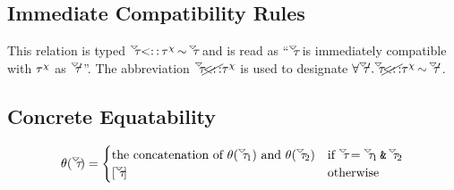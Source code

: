 \documentclass{article}
\begin{document}
\subsection*{Immediate Compatibility Rules}

{\footnotesize This relation is typed $\tauDownOpen \immCompat \tauChi \icSeparator \tauDownOpen$ and is read as ``$\tauDownOpen$ is immediately compatible with $\tauChi$ as $\tauDownOpen'$''.  The abbreviation $\tauDownOpen \cancel{\immCompat} \tauChi$ is used to designate $\forall \tauDownOpen' . \tauDownOpen \cancel{\immCompat} \tauChi \icSeparator \tauDownOpen'$.}

\begin{mathpar}
    
    
    
    
    
    
\end{mathpar}

\subsection*{Concrete Equatability}

$$
\flatten{\tauDownOpen} =
    \begin{cases}
        \textrm{the concatenation of }\flatten{\tauDownOpen_1}\textrm{ and }\flatten{\tauDownOpen_2} & \textrm{if }\tauDownOpen = \tauDownOpen_1 \gtAmp \tauDownOpen_2 \\
        [\tauDownOpen] & \textrm{otherwise}
    \end{cases}
$$
\end{document}
